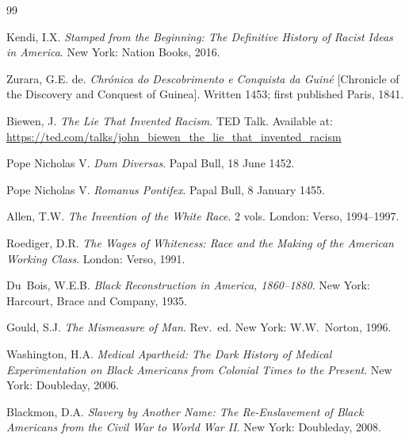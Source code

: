 \documentclass[12pt,openany]{book}
\begin{document}
\begin{thebibliography}{99}


Kendi, I.X. \textit{Stamped from the Beginning: The Definitive History of Racist Ideas in America}. New York: Nation Books, 2016.

Zurara, G.E. de. \textit{Chr\'{o}nica do Descobrimento e Conquista da Guin\'{e}} [Chronicle of the Discovery and Conquest of Guinea]. Written 1453; first published Paris, 1841.

Biewen, J. \textit{The Lie That Invented Racism}. TED Talk. Available at: \url{https://ted.com/talks/john_biewen_the_lie_that_invented_racism}


Pope Nicholas V. \textit{Dum Diversas}. Papal Bull, 18 June 1452.

Pope Nicholas V. \textit{Romanus Pontifex}. Papal Bull, 8 January 1455.


Allen, T.W. \textit{The Invention of the White Race}. 2 vols. London: Verso, 1994--1997.

Roediger, D.R. \textit{The Wages of Whiteness: Race and the Making of the American Working Class}. London: Verso, 1991.

Du~Bois, W.E.B. \textit{Black Reconstruction in America, 1860--1880}. New York: Harcourt, Brace and Company, 1935.


Gould, S.J. \textit{The Mismeasure of Man}. Rev.\ ed. New York: W.W.\ Norton, 1996.

Washington, H.A. \textit{Medical Apartheid: The Dark History of Medical Experimentation on Black Americans from Colonial Times to the Present}. New York: Doubleday, 2006.


Blackmon, D.A. \textit{Slavery by Another Name: The Re-Enslavement of Black Americans from the Civil War to World War II}. New York: Doubleday, 2008.


\end{thebibliography}
\end{document}
